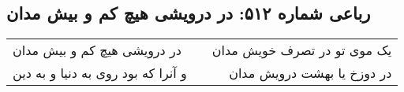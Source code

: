 \begin{center}
\section*{رباعی شماره ۵۱۲: در درویشی هیچ کم و بیش مدان}
\label{sec:sh512}
\begin{longtable}{l p{0.5cm} r}
در درویشی هیچ کم و بیش مدان
&&
یک موی تو در تصرف خویش مدان
\\
و آنرا که بود روی به دنیا و به دین
&&
در دوزخ یا بهشت درویش مدان
\\
\end{longtable}
\end{center}
